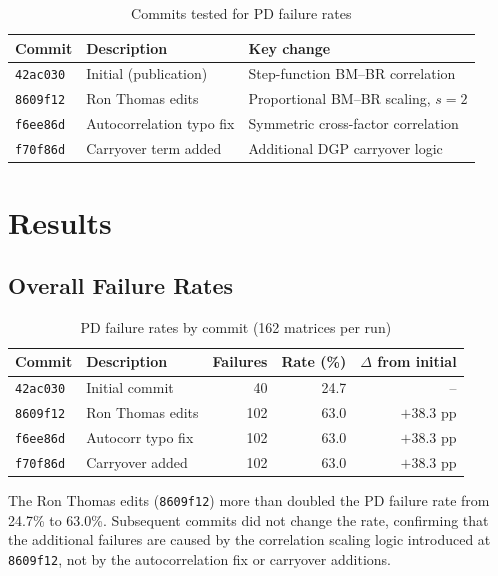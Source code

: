 \documentclass[11pt]{article}
\begin{document}
\begin{table}[h]
\centering
\caption{Commits tested for PD failure rates}
\begin{tabular}{lll}
\toprule
Commit & Description & Key change \\
\midrule
\texttt{42ac030} & Initial (publication) &
  Step-function BM--BR correlation \\
\texttt{8609f12} & Ron Thomas edits &
  Proportional BM--BR scaling, $s = 2$ \\
\texttt{f6ee86d} & Autocorrelation typo fix &
  Symmetric cross-factor correlation \\
\texttt{f70f86d} & Carryover term added &
  Additional DGP carryover logic \\
\bottomrule
\end{tabular}
\end{table}

\section{Results}

\subsection{Overall Failure Rates}

\begin{table}[h]
\centering
\caption{PD failure rates by commit (162 matrices per run)}
\begin{tabular}{llrrr}
\toprule
Commit & Description & Failures & Rate (\%) &
  $\Delta$ from initial \\
\midrule
\texttt{42ac030} & Initial commit &
  40 & 24.7 & -- \\
\texttt{8609f12} & Ron Thomas edits &
  102 & 63.0 & $+38.3$ pp \\
\texttt{f6ee86d} & Autocorr typo fix &
  102 & 63.0 & $+38.3$ pp \\
\texttt{f70f86d} & Carryover added &
  102 & 63.0 & $+38.3$ pp \\
\bottomrule
\end{tabular}
\label{tab:rates}
\end{table}

The Ron Thomas edits (\texttt{8609f12}) more than doubled the
PD failure rate from 24.7\% to 63.0\%. Subsequent commits did
not change the rate, confirming that the additional failures are
caused by the correlation scaling logic introduced at
\texttt{8609f12}, not by the autocorrelation fix or carryover
additions.
\end{document}
